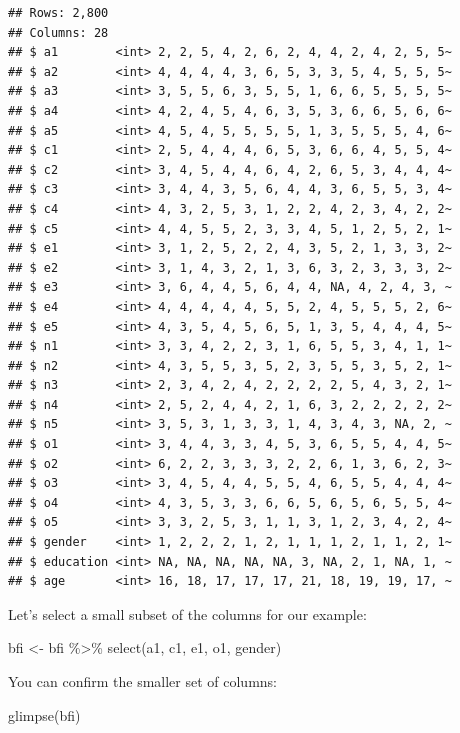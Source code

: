 \documentclass[
]{krantz}
\makeatletter
\newenvironment{Shaded}{\begin{snugshade}}{\end{snugshade}}
\newcommand{\FunctionTok}[1]{\textcolor[rgb]{0,0,0}{#1}}
\newcommand{\NormalTok}[1]{#1}
\newcommand{\OtherTok}[1]{\textcolor[rgb]{0.37,0.37,0.37}{#1}}
\newcommand{\SpecialCharTok}[1]{\textcolor[rgb]{0,0,0}{#1}}
\newenvironment{kframe}{%
\medskip{}
\setlength{\fboxsep}{.8em}
 \def\at@end@of@kframe{}%
 \ifinner\ifhmode%
  \def\at@end@of@kframe{\end{minipage}}%
  \begin{minipage}{\columnwidth}%
 \fi\fi%
 \def\FrameCommand##1{\hskip\@totalleftmargin \hskip-\fboxsep
 \colorbox{shadecolor}{##1}\hskip-\fboxsep
     \hskip-\linewidth \hskip-\@totalleftmargin \hskip\columnwidth}%
 \MakeFramed {\advance\hsize-\width
   \@totalleftmargin\z@ \linewidth\hsize
   \@setminipage}}%
 {\par\unskip\endMakeFramed%
 \at@end@of@kframe}
\renewenvironment{Shaded}{\begin{kframe}}{\end{kframe}}
\makeatother
\begin{document}
\begin{verbatim}
## Rows: 2,800
## Columns: 28
## $ a1        <int> 2, 2, 5, 4, 2, 6, 2, 4, 4, 2, 4, 2, 5, 5~
## $ a2        <int> 4, 4, 4, 4, 3, 6, 5, 3, 3, 5, 4, 5, 5, 5~
## $ a3        <int> 3, 5, 5, 6, 3, 5, 5, 1, 6, 6, 5, 5, 5, 5~
## $ a4        <int> 4, 2, 4, 5, 4, 6, 3, 5, 3, 6, 6, 5, 6, 6~
## $ a5        <int> 4, 5, 4, 5, 5, 5, 5, 1, 3, 5, 5, 5, 4, 6~
## $ c1        <int> 2, 5, 4, 4, 4, 6, 5, 3, 6, 6, 4, 5, 5, 4~
## $ c2        <int> 3, 4, 5, 4, 4, 6, 4, 2, 6, 5, 3, 4, 4, 4~
## $ c3        <int> 3, 4, 4, 3, 5, 6, 4, 4, 3, 6, 5, 5, 3, 4~
## $ c4        <int> 4, 3, 2, 5, 3, 1, 2, 2, 4, 2, 3, 4, 2, 2~
## $ c5        <int> 4, 4, 5, 5, 2, 3, 3, 4, 5, 1, 2, 5, 2, 1~
## $ e1        <int> 3, 1, 2, 5, 2, 2, 4, 3, 5, 2, 1, 3, 3, 2~
## $ e2        <int> 3, 1, 4, 3, 2, 1, 3, 6, 3, 2, 3, 3, 3, 2~
## $ e3        <int> 3, 6, 4, 4, 5, 6, 4, 4, NA, 4, 2, 4, 3, ~
## $ e4        <int> 4, 4, 4, 4, 4, 5, 5, 2, 4, 5, 5, 5, 2, 6~
## $ e5        <int> 4, 3, 5, 4, 5, 6, 5, 1, 3, 5, 4, 4, 4, 5~
## $ n1        <int> 3, 3, 4, 2, 2, 3, 1, 6, 5, 5, 3, 4, 1, 1~
## $ n2        <int> 4, 3, 5, 5, 3, 5, 2, 3, 5, 5, 3, 5, 2, 1~
## $ n3        <int> 2, 3, 4, 2, 4, 2, 2, 2, 2, 5, 4, 3, 2, 1~
## $ n4        <int> 2, 5, 2, 4, 4, 2, 1, 6, 3, 2, 2, 2, 2, 2~
## $ n5        <int> 3, 5, 3, 1, 3, 3, 1, 4, 3, 4, 3, NA, 2, ~
## $ o1        <int> 3, 4, 4, 3, 3, 4, 5, 3, 6, 5, 5, 4, 4, 5~
## $ o2        <int> 6, 2, 2, 3, 3, 3, 2, 2, 6, 1, 3, 6, 2, 3~
## $ o3        <int> 3, 4, 5, 4, 4, 5, 5, 4, 6, 5, 5, 4, 4, 4~
## $ o4        <int> 4, 3, 5, 3, 3, 6, 6, 5, 6, 5, 6, 5, 5, 4~
## $ o5        <int> 3, 3, 2, 5, 3, 1, 1, 3, 1, 2, 3, 4, 2, 4~
## $ gender    <int> 1, 2, 2, 2, 1, 2, 1, 1, 1, 2, 1, 1, 2, 1~
## $ education <int> NA, NA, NA, NA, NA, 3, NA, 2, 1, NA, 1, ~
## $ age       <int> 16, 18, 17, 17, 17, 21, 18, 19, 19, 17, ~
\end{verbatim}

Let's select a small subset of the columns for our example:

\begin{Shaded}
\begin{Highlighting}[]
\NormalTok{bfi }\OtherTok{\textless{}{-}}\NormalTok{ bfi }\SpecialCharTok{\%\textgreater{}\%}
  \FunctionTok{select}\NormalTok{(a1, c1, e1, o1, gender)}
\end{Highlighting}
\end{Shaded}

You can confirm the smaller set of columns:

\begin{Shaded}
\begin{Highlighting}[]
\FunctionTok{glimpse}\NormalTok{(bfi)}
\end{Highlighting}
\end{Shaded}
\end{document}
